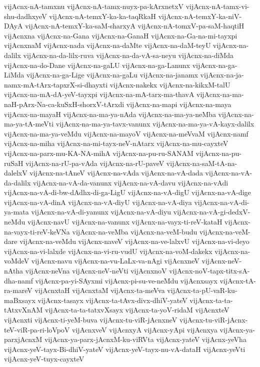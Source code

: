 {vijAcnx-nA-tamxnu
vijAcnx-nA-tamx-nuyx-pa-kArxnetxV
vijAcnx-nA-tamx-vi-shu-dadhxyeV
vijAcnx-nA-temxY-ka-ka-taqRkaH
vijAcnx-nA-temxY-ka-niV-DAyA
vijAcnx-nA-temxY-ka-saM-sharxyA
vijAcnx-nA-tomxV-pa-saM-haqtiH
vijAcnxna
vijAcnx-na-Gana
vijAcnx-na-GanaH
vijAcnx-na-Ga-na-mi-tayxpi
vijAcnxnaM
vijAcnx-nada
vijAcnx-na-daMte
vijAcnx-na-daM-teyU
vijAcnx-na-dalilx
vijAcnx-na-da-lilx-ruva
vijAcnx-na-da-vA-sa-neyu
vijAcnx-na-diMda
vijAcnx-na-do-Dane
vijAcnx-na-gaLU
vijAcnx-na-ga-Lanunx
vijAcnx-na-ga-LiMda
vijAcnx-na-ga-Lige
vijAcnx-na-gaLu
vijAcnx-na-janamx
vijAcnx-na-ja-namx-mA-tArx-tapxrX-si-dhayxti
vijAcnx-nakekx
vijAcnx-na-kikxM-talU
vijAcnx-na-mA-dA-yeV-tayxpi
vijAcnx-na-mA-tarx-ma-thavA
vijAcnx-na-ma-naH-pArx-Na-ca-kuSxH-shorxV-tArxdi
vijAcnx-na-mapi
vijAcnx-na-maya
vijAcnx-na-mayaH
vijAcnx-na-ma-ya-nAda
vijAcnx-na-ma-ya-neMba
vijAcnx-na-ma-ya-tA-meVti
vijAcnx-na-ma-ya-tavx-vanunx
vijAcnx-na-ma-ya-vA-kayx-dalilx
vijAcnx-na-ma-ya-veMdu
vijAcnx-na-mayoV
vijAcnx-na-meVvaM
vijAcnx-namf
vijAcnx-na-miha
vijAcnx-na-mi-tayx-neV-nAtarx
vijAcnx-na-mu-cayxteV
vijAcnx-na-parx-mu-KA-NA-mihA
vijAcnx-na-pu-ru-SANAM
vijAcnx-na-pu-ruSaH
vijAcnx-na-rU-pa-vAda
vijAcnx-na-rU-paveV
vijAcnx-na-saM-tA-na-dalelxV
vijAcnx-na-tAneV
vijAcnx-na-vAda
vijAcnx-na-vA-dada
vijAcnx-na-vA-da-dalilx
vijAcnx-na-vA-da-vanunx
vijAcnx-na-vA-davu
vijAcnx-na-vAdi
vijAcnx-na-vA-di-bw-dAdhx-di-ga-LigU
vijAcnx-na-vA-digU
vijAcnx-na-vA-dige
vijAcnx-na-vA-dinA
vijAcnx-na-vA-diyU
vijAcnx-na-vA-diya
vijAcnx-na-vA-di-ya-mata
vijAcnx-na-vA-di-yanunx
vijAcnx-na-vA-diyu
vijAcnx-na-vA-gi-dedxV-neMdu
vijAcnx-navU
vijAcnx-na-vanunx
vijAcnx-na-vayx-ti-reV-kataH
vijAcnx-na-vayx-ti-reV-keVNa
vijAcnx-na-veMba
vijAcnx-na-veM-budu
vijAcnx-na-veM-dare
vijAcnx-na-veMdu
vijAcnx-naveV
vijAcnx-na-ve-lalxvU
vijAcnx-na-vi-deyo
vijAcnx-na-vi-lalxde
vijAcnx-na-vi-ru-vudU
vijAcnx-na-voM-dakekx
vijAcnx-na-voMdeV
vijAcnx-navu
vijAcnx-na-vu-LaLx-va-nAgi
vijAcnxneV
vijAcnx-neV-nAtha
vijAcnx-neVna
vijAcnx-neV-neVti
vijAcnxnoV
vijAcnx-noV-tapx-titx-sA-dha-namf
vijAcnx-pa-yi-SAyxmi
vijAcnx-pi-su-ve-neMdu
vijAcnxsayx
vijAcnx-tA-ra-mareV
vijAcnxtaH
vijAcnxtaM
vijAcnx-ta-meVva
vijAcnx-ta-pU-vaR-ku-maBxsayx
vijAcnx-tasayx
vijAcnx-ta-tAvx-divx-dhiV-yateV
vijAcnx-ta-ta-tAtxvXnAM
vijAcnx-ta-ta-tatxvXsayx
vijAcnx-ta-yoV-ridaM
vijAcnxteV
vijAcnxti
vijAcnx-ti-yeM-buva
vijAcnx-tu-viR-jAcnxneV
vijAcnx-tu-viR-jAcnx-teV-viR-pa-ri-loVpoV
vijAcnxveV
vijAcnxyA
vijAcnx-yApi
vijAcnxya
vijAcnx-ya-parxjAcnxM
vijAcnx-ya-parx-jAcnxM-ku-viRVta
vijAcnx-yateV
vijAcnx-yeVha
vijAcnx-yeV-tayx-Bi-dhiV-yateV
vijAcnx-yeV-tayx-nu-vA-dataH
vijAcnx-yeVti
vijAcnx-yeV-tuyx-cayxteV
}

